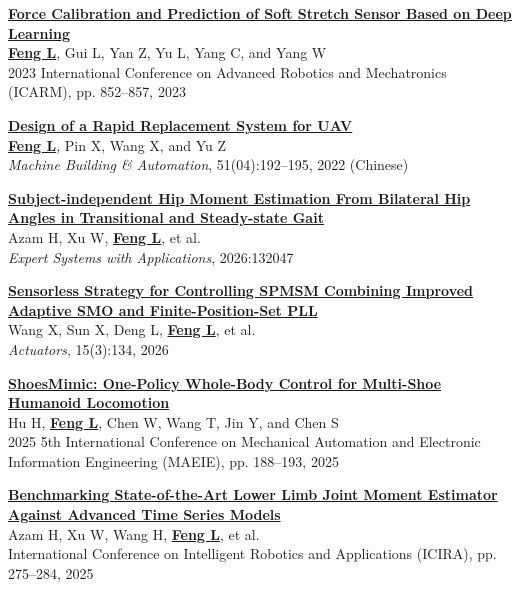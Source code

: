 \documentclass[a4paper,11pt]{article}
\begin{document}
{\begin{enumerate}[leftmargin=*, labelsep=0.5em, align=left, itemindent=0em, label={[\arabic*]}]
\item \href{https://ieeexplore.ieee.org/document/10218756}{\textbf{Force Calibration and Prediction of Soft Stretch Sensor Based on Deep Learning}}\\
\underline{\textbf{Feng L}}, Gui L, Yan Z, Yu L, Yang C, and Yang W\\
2023 International Conference on Advanced Robotics and Mechatronics (ICARM), pp. 852--857, 2023

\item \href{https://kns.cnki.net/kcms2/article/abstract?v=BKa2HtjuZGHC2e_fXMSkY_BU2ZcA9QUK4Y80xMxTGRKSHeLFoUXHpYO5ZSmXZT60JdLTKyQf7eyaKE4ynLs2gnj34ThEsjXoMTDAH4RhA20isd1LltquaMNDVc2sWawwVrc8psoJnlyH_CvP2drlS0ogpusviMFXnrFq2ZfrDKc=&uniplatform=NZKPT&language=CHS}{\textbf{Design of a Rapid Replacement System for UAV}}\\
\underline{\textbf{Feng L}}, Pin X, Wang X, and Yu Z\\
\textit{Machine Building \& Automation}, 51(04):192--195, 2022 (Chinese)

\item \href{https://www.sciencedirect.com/science/article/pii/S0957417426009607}{\textbf{Subject-independent Hip Moment Estimation From Bilateral Hip Angles in Transitional and Steady-state Gait}}\\
Azam H, Xu W, \underline{\textbf{Feng L}}, et al.\\
\textit{Expert Systems with Applications}, 2026:132047

\item \href{https://doi.org/10.3390/act15030134}{\textbf{Sensorless Strategy for Controlling SPMSM Combining Improved Adaptive SMO and Finite-Position-Set PLL}}\\
Wang X, Sun X, Deng L, \underline{\textbf{Feng L}}, et al.\\
\textit{Actuators}, 15(3):134, 2026

\item \href{https://doi.org/10.1109/MAEIE68099.2025.11406013}{\textbf{ShoesMimic: One-Policy Whole-Body Control for Multi-Shoe Humanoid Locomotion}}\\
Hu H, \underline{\textbf{Feng L}}, Chen W, Wang T, Jin Y, and Chen S\\
2025 5th International Conference on Mechanical Automation and Electronic Information Engineering (MAEIE), pp. 188--193, 2025

\item \href{https://link.springer.com/chapter/10.1007/978-981-95-2098-5_24}{\textbf{Benchmarking State-of-the-Art Lower Limb Joint Moment Estimator Against Advanced Time Series Models}}\\
Azam H, Xu W, Wang H, \underline{\textbf{Feng L}}, et al.\\
International Conference on Intelligent Robotics and Applications (ICIRA), pp. 275--284, 2025


\end{enumerate}}
\end{document}
